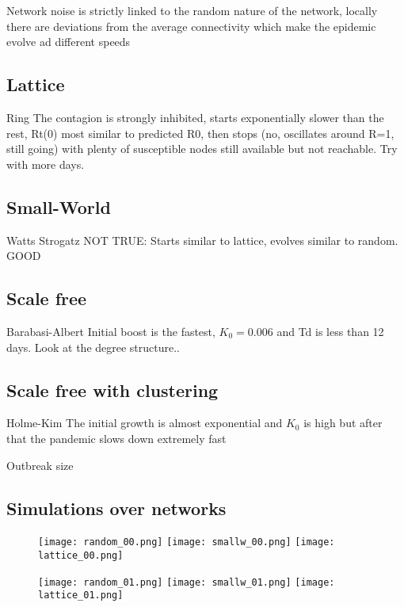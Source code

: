 \documentclass[DIV=12, BCOR=0pt]{scrartcl}  %
\begin{document}
  Network noise is strictly linked to the random nature of the network, locally there are deviations from the average connectivity which make the epidemic evolve ad different speeds
  
  
  
  
  
  \subsection{Lattice}
  Ring
  The contagion is strongly inhibited, starts exponentially slower than the rest, Rt(0) most similar to predicted R0,
  then stops (no, oscillates around R=1, still going) with plenty of susceptible nodes still available but not reachable. Try with more days.
  
  
  \subsection{Small-World}
  Watts Strogatz
  NOT TRUE: Starts similar to lattice, evolves similar to random. GOOD
  
  \subsection{Scale free}
  Barabasi-Albert
  Initial boost is the fastest, $K_0=0.006$ and Td is less than 12 days. Look at the degree structure..
  
  
  \subsection{Scale free with clustering}
  Holme-Kim
  The initial growth is almost exponential and $K_0$ is high but after that the pandemic slows down extremely fast
  
  
  Outbreak size
  
  \subsection{Simulations over networks}
  
  
  \clearpage
  \begin{figure}[h!]
		\centering
	 	\texttt{[image: random\_00.png]}
	 	\texttt{[image: smallw\_00.png]}
	 	\texttt{[image: lattice\_00.png]}

	 	\texttt{[image: random\_01.png]}
	 	\texttt{[image: smallw\_01.png]}
	 	\texttt{[image: lattice\_01.png]}
	 	\caption{ }
		\label{fig:networks0}
	\end{figure}  	
  
\end{document}
